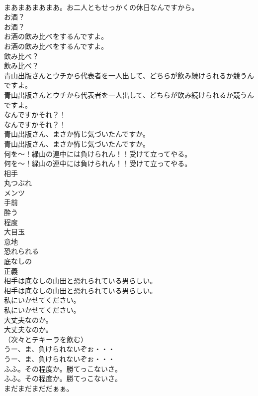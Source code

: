 \documentclass[8pt]{extreport}
\begin{document}
\begin{CJK}{UTF8}{min}
\\	まあまあまあまあ。お二人ともせっかくの休日なんですから。 
\\	お酒？	
\\	お酒？ 
\\	お酒の飲み比べをするんですよ。	
\\	お酒の飲み比べをするんですよ。 
\\	飲み比べ？	
\\	飲み比べ？ 
\\	青山出版さんとウチから代表者を一人出して、どちらが飲み続けられるか競うんですよ。	
\\	青山出版さんとウチから代表者を一人出して、どちらが飲み続けられるか競うんですよ。 
\\	なんですかそれ？！	
\\	なんですかそれ？！ 
\\	青山出版さん、まさか怖じ気づいたんですか。	
\\	青山出版さん、まさか怖じ気づいたんですか。 
\\	何を～！緑山の連中には負けられん！！受けて立ってやる。	
\\	何を～！緑山の連中には負けられん！！受けて立ってやる。 
\\	相手
\\	丸つぶれ
\\	メンツ
\\	手前
\\	酔う
\\	程度
\\	大目玉
\\	意地
\\	恐れられる
\\	底なしの
\\	正義
\\	相手は底なしの山田と恐れられている男らしい。	
\\	相手は底なしの山田と恐れられている男らしい。 
\\	私にいかせてください。	
\\	私にいかせてください。 
\\	大丈夫なのか。	
\\	大丈夫なのか。 
\\	（次々とテキーラを飲む）	
\\	うー、ま、負けられないぞぉ・・・	
\\	うー、ま、負けられないぞぉ・・・ 
\\	ふふ。その程度か。勝てっこないさ。	
\\	ふふ。その程度か。勝てっこないさ。 
\\	まだまだまだだぁぁ。	

\end{CJK}
\end{document}
